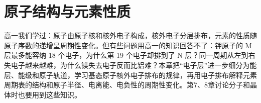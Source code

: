 \documentclass[UTF8,a4paper,zihao=5,oneside,openany,fontset=none]{ctexbook}
\begin{document}
\newcommand{\csixlev}[4]{\foreach \csixk in {1,...,#3}{\draw[c6box] ({#1+\csixk-1},#2) rectangle ++(1,1);}%
  \node[font=\scriptsize,below] at ({#1+#3/2},#2) {#4};}
\newcommand{\csixlv}[4]{\foreach \csixk in {1,...,#3}{\draw[c6box] ({#1+(\csixk-1)*0.24},#2) rectangle ++(0.24,0.48);}%
  \node[left,font=\scriptsize,inner sep=1.5pt] at (#1,#2+0.24) {#4};}
\newcommand{\csixlobe}[2]{\shade[ball color=mainblue!55,rotate=#1,xscale=#2]
  (0,0) .. controls (0.22,0.46) and (0.98,0.56) .. (1.05,0) .. controls (0.98,-0.56) and (0.22,-0.46) .. (0,0);}
\newcommand{\csixaxes}{\draw[c6ax] (0,-1.25)--(0,1.4) node[above,font=\scriptsize]{$z$};
  \draw[c6ax] (-1.25,0)--(1.4,0) node[right,font=\scriptsize]{$y$};
  \draw[c6ax] (0.72,0.58)--(-0.9,-0.72) node[below left,font=\scriptsize,inner sep=1pt]{$x$};}
\newcommand{\csixcell}[3]{\draw[#3,draw=black!45,line width=0.3pt] (#1-1,-#2) rectangle ++(1,1);}
\newcommand{\csixsame}{\begin{tikzpicture}[baseline={(0,-0.12)},x=0.46cm,y=0.46cm,line width=0.5pt]
  \draw (0,-0.5) rectangle ++(1,1);
  \draw[-{Stealth[length=1.1mm]}] (0.33,-0.35)--(0.33,0.38);
  \draw[-{Stealth[length=1.1mm]}] (0.67,-0.35)--(0.67,0.38);\end{tikzpicture}}

\chapter{原子结构与元素性质}

高一我们学过：原子由原子核和核外电子构成，核外电子分层排布，元素的性质随原子序数的递增呈周期性变化。但有些问题用高一的知识回答不了：钾原子的 M 层最多能容纳 18 个电子，为什么第 19 个电子却排到了 N 层？同一周期从左到右失电子越来越难，为什么镁失去电子反而比铝难？本章把“电子层”进一步细分为能层、能级和原子轨道，学习基态原子核外电子排布的规律，再用电子排布解释元素周期表的结构和原子半径、电离能、电负性的周期性变化。第7、8章讨论分子和晶体时也要用到这些知识。
\end{document}
